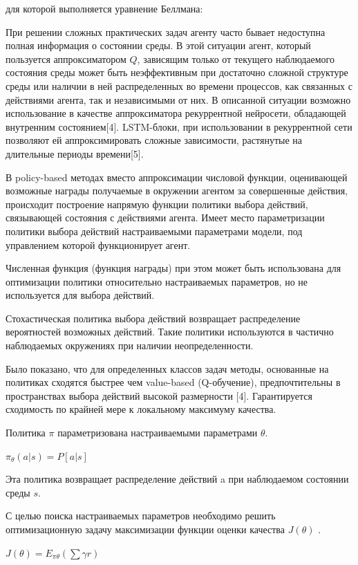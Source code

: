 для которой выполняется уравнение Беллмана:

При решении сложных практических задач агенту часто бывает недоступна полная информация о состоянии среды. В этой ситуации агент, который пользуется аппроксиматором $Q$, зависящим только от текущего наблюдаемого состояния среды может быть неэффективным при достаточно сложной структуре среды или наличии в ней распределенных во времени процессов, как связанных с действиями агента, так и независимыми от них. В описанной ситуации возможно использование в качестве аппроксиматора рекуррентной нейросети, обладающей внутренним состоянием[4]. LSTM-блоки, при использовании в рекуррентной сети позволяют ей аппроксимировать сложные зависимости, растянутые на длительные периоды времени[5].



В policy-based методах вместо аппроксимации числовой функции, оценивающей возможные награды получаемые в окружении агентом за совершенные действия, происходит построение напрямую функции политики выбора действий, связывающей состояния с действиями агента. Имеет место параметризации политики выбора действий настраиваемыми параметрами модели, под управлением которой функционирует агент.

Численная функция (функция награды) при этом может быть использована для оптимизации политики относительно настраиваемых параметров, но не используется для выбора действий.

Стохастическая политика выбора действий возвращает распределение вероятностей возможных действий. Такие политики используются в частично наблюдаемых окружениях при наличии неопределенности.


Было показано, что для определенных классов задач методы, основанные на политиках сходятся быстрее чем value-based (Q-обучение), предпочтительны в пространствах выбора действий высокой размерности [4]. Гарантируется сходимость по крайней мере к локальному максимуму качества.


Политика $\pi$ параметризована настраиваемыми параметрами $\theta$.

$\pi_{\theta} (a|s)= P[a|s]$

Эта политика возвращает распределение действий a при наблюдаемом состоянии среды $s$.

С целью поиска настраиваемых параметров необходимо решить оптимизационную задачу максимизации функции оценки качества $J( \theta )$ .

$J( \theta )=E_{ \pi  \theta } ( \sum  \gamma r)$

